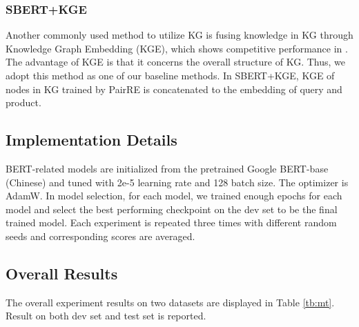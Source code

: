 \subsubsection{SBERT+KGE}
Another commonly used method to utilize KG is fusing knowledge in KG through Knowledge Graph Embedding (KGE), which shows competitive performance in \cite{luo2021alicoco2, huang2019knowledge, sun2018recurrent}. The advantage of KGE is that it concerns the overall structure of KG. Thus, we adopt this method as one of our baseline methods. In SBERT+KGE, KGE of nodes in KG trained by PairRE \cite{chao-etal-2021-pairre} is concatenated to the embedding of query and product.


\subsection{Implementation Details}
 BERT-related models are initialized from the pretrained Google BERT-base (Chinese) and tuned with 2e-5 learning rate and 128 batch size. The optimizer is AdamW. In model selection, for each model, we trained enough epochs for each model and select the best performing checkpoint on the dev set to be the final trained model. Each experiment is repeated three times with different random seeds and corresponding scores are averaged.

\subsection{Overall Results}

The overall experiment results on two datasets are displayed in Table \ref{tb:mt}. Result on both dev set and test set is reported.



